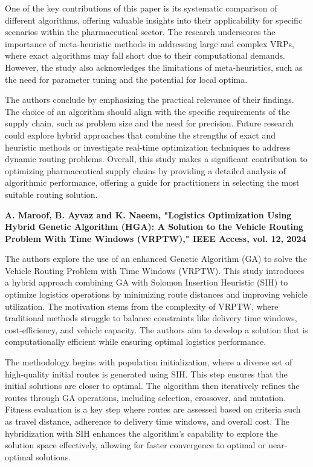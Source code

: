 One of the key contributions of this paper is its systematic comparison of different algorithms, offering valuable insights into their applicability for specific scenarios within the pharmaceutical sector. The research underscores the importance of meta-heuristic methods in addressing large and complex VRPs, where exact algorithms may fall short due to their computational demands. However, the study also acknowledges the limitations of meta-heuristics, such as the need for parameter tuning and the potential for local optima.

The authors conclude by emphasizing the practical relevance of their findings. The choice of an algorithm should align with the specific requirements of the supply chain, such as problem size and the need for precision. Future research could explore hybrid approaches that combine the strengths of exact and heuristic methods or investigate real-time optimization techniques to address dynamic routing problems. Overall, this study makes a significant contribution to optimizing pharmaceutical supply chains by providing a detailed analysis of algorithmic performance, offering a guide for practitioners in selecting the most suitable routing solution.

\textbf{\cite{maroof2024hybridgenetic} A. Maroof, B. Ayvaz and K. Naeem, "Logistics Optimization Using Hybrid Genetic Algorithm (HGA): A Solution to the Vehicle Routing Problem With Time Windows (VRPTW)," IEEE Access, vol. 12, 2024}

The authors explore the use of an enhanced Genetic Algorithm (GA) to solve the Vehicle Routing Problem with Time Windows (VRPTW). This study introduces a hybrid approach combining GA with Solomon Insertion Heuristic (SIH) to optimize logistics operations by minimizing route distances and improving vehicle utilization. The motivation stems from the complexity of VRPTW, where traditional methods struggle to balance constraints like delivery time windows, cost-efficiency, and vehicle capacity. The authors aim to develop a solution that is computationally efficient while ensuring optimal logistics performance.

The methodology begins with population initialization, where a diverse set of high-quality initial routes is generated using SIH. This step ensures that the initial solutions are closer to optimal. The algorithm then iteratively refines the routes through GA operations, including selection, crossover, and mutation. Fitness evaluation is a key step where routes are assessed based on criteria such as travel distance, adherence to delivery time windows, and overall cost. The hybridization with SIH enhances the algorithm's capability to explore the solution space effectively, allowing for faster convergence to optimal or near-optimal solutions.

